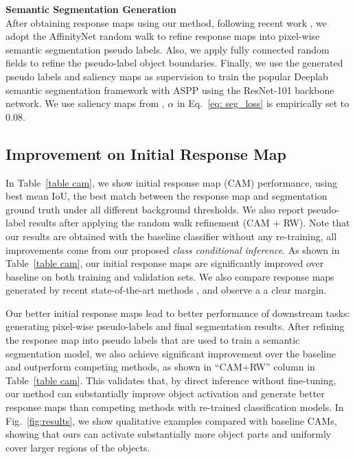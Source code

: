 \documentclass[10pt,twocolumn,letterpaper]{article}
\begin{document}
\noindent\textbf{Semantic Segmentation Generation}\\
After obtaining response maps using our method, following recent work \cite{wang2020self, chang2020weakly, chang2020mixup, sun2020mining, chen2020weakly}, 
we adopt the AffinityNet random walk \cite{ahn2018learning} to refine response maps into pixel-wise semantic segmentation pseudo labels.
Also, we apply fully connected random fields \cite{krahenbuhl2011efficient} to refine the pseudo-label object boundaries.
Finally, we use the generated pseudo labels and saliency maps as supervision to train the popular Deeplab semantic segmentation framework with ASPP \cite{chen2017deeplab} using the ResNet-101 backbone network. 
We use  saliency maps from \cite{jiang2019integral}, $\alpha$ in Eq.~\ref{eq: seg_loss} is empirically set to 0.08.


\subsection{Improvement on Initial Response Map}
In Table~\ref{table cam}, we show initial response map (CAM) performance, using best mean IoU,
\ie the best match between the response map and segmentation ground truth under all different background thresholds.
We also report pseudo-label results 
after applying the random walk refinement (CAM + RW). 
Note
that our results are obtained with the baseline classifier without any re-training, all improvements come from our proposed \emph{class conditional inference}.
As shown in Table~\ref{table cam}, our initial response maps are significantly improved over baseline \cite{ahn2018learning} on both training and validation sets. We also compare
response maps generated by recent state-of-the-art methods \cite{chang2020mixup,chang2020weakly}, and observe a
a clear
margin. 

Our better initial response maps lead to better performance of downstream tasks: generating pixel-wise pseudo-labels and final segmentation results.
After refining the response map into  pseudo labels that are used to train a semantic segmentation model,  
we also achieve significant improvement over the baseline and outperform competing methods, as shown in \enquote{CAM+RW} 
column in Table~\ref{table cam}.
This validates that, by direct inference without fine-tuning, our method can substantially improve object activation and generate better response maps than competing methods with re-trained classification models.
In Fig.~\ref{fig:results}, we show qualitative examples compared with baseline CAMs, showing that ours can activate substantially more object parts and
uniformly cover larger regions of the objects.
\end{document}
